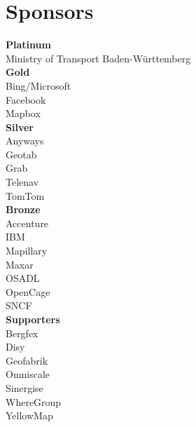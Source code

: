 \section*{Sponsors}
\label{sponsors}
\RaggedRight
\begin{multicols}{2}
  \begin{small}
    \textbf{Platinum}\\
    Ministry of Transport Baden-Württemberg\\

    \vspace{\volunteerSpace}
    \textbf{Gold}\\
    Bing/Microsoft\\
    Facebook\\
    Mapbox\\

    \vspace{\volunteerSpace}
    \textbf{Silver}\\
    Anyways\\
    Geotab\\
    Grab\\
    Telenav\\
    TomTom\\

    \vspace{\volunteerSpace}
    \textbf{Bronze}\\
    Accenture\\
    IBM\\
    Mapillary\\
    Maxar\\
    OSADL\\
    OpenCage\\
    SNCF\\

    \vspace{\volunteerSpace}
    \textbf{Supporters}\\
    Bergfex\\
    Disy\\
    Geofabrik\\
    Omniscale\\
    Sinergise\\
    WhereGroup\\
    YellowMap\\

  \end{small}
\end{multicols}

\justifying
